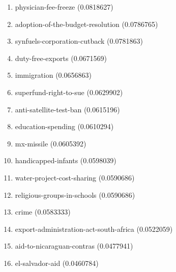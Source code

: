 \begin{enumerate}
\item physician-fee-freeze (0.0818627)
\item adoption-of-the-budget-resolution (0.0786765)
\item synfuels-corporation-cutback (0.0781863)
\item duty-free-exports (0.0671569)
\item immigration (0.0656863)
\item superfund-right-to-sue (0.0629902)
\item anti-satellite-test-ban (0.0615196)
\item education-spending (0.0610294)
\item mx-missile (0.0605392)
\item handicapped-infants (0.0598039)
\item water-project-cost-sharing (0.0590686)
\item religious-groups-in-schools (0.0590686)
\item crime (0.0583333)
\item export-administration-act-south-africa (0.0522059)
\item aid-to-nicaraguan-contras (0.0477941)
\item el-salvador-aid (0.0460784)
\end{enumerate}